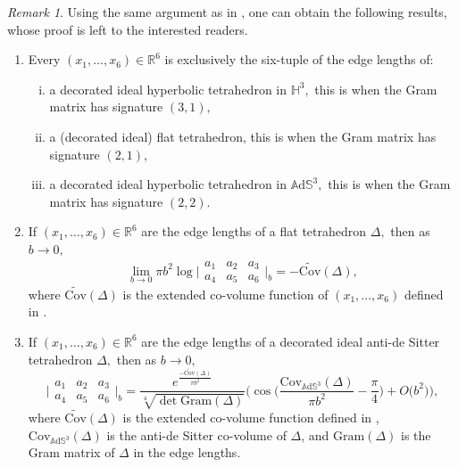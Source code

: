 \documentclass[11pt]{article}
\theoremstyle{remark}
\newtheorem{remark}[theorem]{Remark}
\theoremstyle{remark}
\numberwithin{equation}{section}
\begin{document}
\begin{remark}
Using the same argument as in \cite{LMSWY, LMSWY2}, one can obtain the following results, whose proof is left to the interested readers.
\begin{enumerate}[(1)]
\item Every $(x_1,\dots, x_6)\in \mathbb R^6$ is exclusively the six-tuple of the edge lengths of:
\begin{enumerate}[(i)]
\item a decorated ideal hyperbolic tetrahedron in $\mathbb H^3,$ this is when the Gram matrix has signature $(3,1),$ 
\item a (decorated ideal) flat tetrahedron, this is when the Gram matrix has signature $(2,1),$ 
\item a decorated ideal hyperbolic tetrahedron in  $\mathbb A\mathrm d\mathbb S^3,$ this is when the Gram matrix has signature $(2,2).$   
\end{enumerate}


\item If $(x_1,\dots, x_6)\in{\mathbb R^6}$ are the edge lengths of a flat tetrahedron $\Delta,$ then as $b\to 0,$
$$\lim_{b\to 0}\pi b^2\log\bigg|\begin{matrix} a_1 & a_2 & a_3 \\ a_4 & a_5 & a_6 \end{matrix}  \bigg|_b=-\widetilde{\mathrm{Cov}}(\Delta),$$
where $\widetilde{\mathrm{Cov}}(\Delta)$ is the extended co-volume function of $(x_1,\dots,x_6)$ defined in \cite{LY}.

\item If $(x_1,\dots, x_6)\in\mathbb R^6$ are the edge lengths of a decorated ideal anti-de Sitter tetrahedron $\Delta,$ then  as $b\to 0,$
\begin{equation*}\label{AdS/CFT}
\bigg|\begin{matrix} a_1 & a_2 & a_3 \\ a_4 & a_5 & a_6 \end{matrix}  \bigg|_b=\frac{e^{\frac{-\widetilde{\mathrm{Cov}}(\Delta)}{\pi b^2}} }{\sqrt[4]{\det\mathrm{Gram}(\Delta)}} \Bigg(\cos\bigg( {\frac{\mathrm{Cov}_{\mathbb A\mathrm d\mathbb S^3}(\Delta)}{\pi b^2}}-\frac{\pi}{4}\bigg) +O\big(b^2\big)\Bigg),
\end{equation*}
where $\widetilde{\mathrm{Cov}}(\Delta)$ is the extended co-volume function defined in \cite{LY}, $\mathrm{Cov}_{\mathbb A\mathrm d\mathbb S^3}(\Delta)$ is the anti-de Sitter co-volume of $\Delta$, and $\mathrm{Gram}(\Delta)$ is the Gram matrix of $\Delta$ in the edge lengths.
\end{enumerate}
\end{remark}
\end{document}
